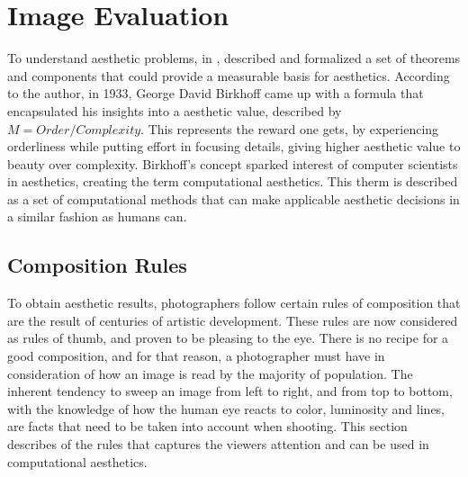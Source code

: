 \section{Image Evaluation}
\label{sec:photo_eval}
To understand aesthetic problems, \citeauthor{Hoenig2005} in \cite{Hoenig2005}, described and formalized a set of theorems and components that could provide a measurable basis for aesthetics.
According to the author, in 1933, George David Birkhoff came up with a formula that encapsulated his insights into a aesthetic value, described by $ M = Order/Complexity $. This represents the reward one gets, by experiencing orderliness while putting effort in focusing details, giving higher aesthetic value to beauty over complexity. Birkhoff's concept sparked interest of computer scientists in aesthetics, creating the term computational aesthetics. This therm is described as a set of computational methods that can make applicable aesthetic decisions in a similar fashion as humans can.


\subsection{Composition Rules}
\label{sub:photo_rules}

To obtain aesthetic results, photographers follow certain rules of composition that are the result of centuries of artistic development. These rules are now considered as rules of thumb, and proven to be pleasing to the eye.
There is no recipe for a good composition, and for that reason, a photographer must have in consideration of how an image is read by the majority of population. The inherent tendency to sweep an image from left to right, and from top to bottom, with the knowledge of how the human eye reacts to color, luminosity and  lines, are facts that need to be taken into account when shooting. This section describes of the rules that captures the viewers attention and can be used in computational aesthetics.

